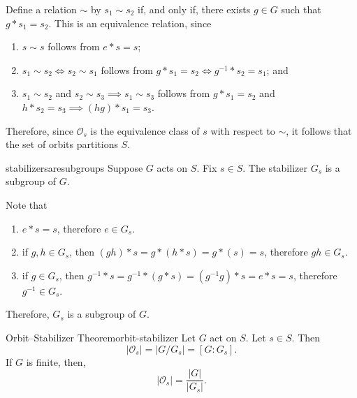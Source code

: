 \begin{dem}{}{}
  Define a relation \(\sim\) by \(s_1 \sim s_2\) if, and only if, there exists \(g \in G\) such that  \(g*s_1 = s_2\). This is an equivalence relation, since 
  \begin{enumerate}
    \item \(s \sim s\) follows from \(e*s = s\);
    \item \(s_1 \sim s_2 \iff s_2 \sim s_1\) follows from \(g*s_1 = s_2 \iff g^{-1}*s_2 = s_1\); and
    \item \(s_1 \sim s_2\) and \(s_2 \sim s_3 \implies s_1 \sim s_3\) follows from \(g*s_1 = s_2\) and  \(h*s_2 = s_3 \implies (hg)*s_1 = s_3\).
  \end{enumerate}

  Therefore, since \(\mathcal{O}_s\) is the equivalence class of \(s\) with respect to \(\sim\), it follows that the set of orbits partitions \(S\).
\end{dem}

\begin{prop}{}{stabilizersaresubgroups}
  Suppose \(G\) acts on \(S\). Fix \(s \in S\). The stabilizer \(G_s\) is a subgroup of \(G\).
\end{prop}

\begin{dem}{}{}
  Note that
  \begin{enumerate}
    \item \(e * s = s\), therefore \(e \in G_s\).
    \item if \(g, h \in G_s\), then \((gh)*s = g*(h*s)=g*(s)=s\), therefore \(gh \in G_s\).
    \item if \(g \in G_s\), then \(g^{-1}*s = g^{-1}*(g*s) = (g^{-1}g)*s = e*s = s\), therefore \(g^{-1} \in G_s\).
  \end{enumerate}

  Therefore, \(G_s\) is a subgroup of \(G\).
\end{dem}

\begin{thm}{Orbit--Stabilizer Theorem}{orbit-stabilizer}
  Let \(G\) act on \(S\). Let \(s \in S\). Then \[
    \left| \mathcal{O}_s \right| = \left| G/G_s \right| = [G : G_s].
  \] 
  If \(G\) is finite, then, \[
    \left| \mathcal{O}_s \right| = \frac{|G|}{|G_s|}.
  \] 
\end{thm}

